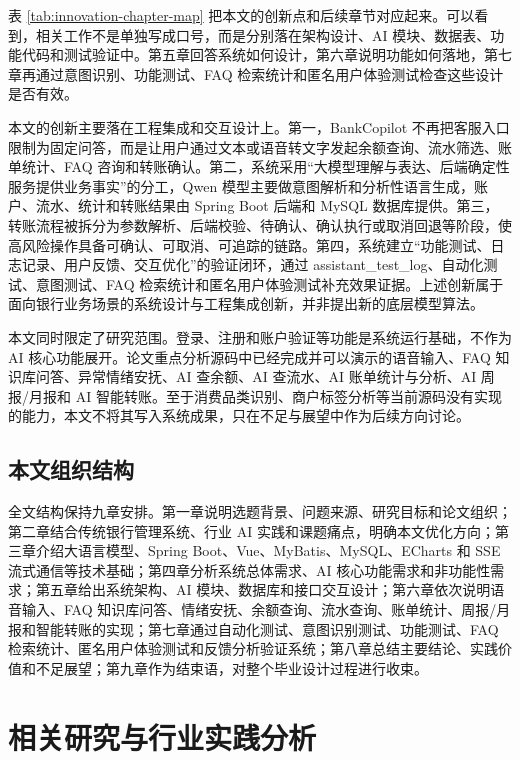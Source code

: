 \documentclass[bachelor, print]{xduthesis}
\begin{document}
表 \ref{tab:innovation-chapter-map} 把本文的创新点和后续章节对应起来。可以看到，相关工作不是单独写成口号，而是分别落在架构设计、AI 模块、数据表、功能代码和测试验证中。第五章回答系统如何设计，第六章说明功能如何落地，第七章再通过意图识别、功能测试、FAQ 检索统计和匿名用户体验测试检查这些设计是否有效。

本文的创新主要落在工程集成和交互设计上。第一，BankCopilot 不再把客服入口限制为固定问答，而是让用户通过文本或语音转文字发起余额查询、流水筛选、账单统计、FAQ 咨询和转账确认。第二，系统采用“大模型理解与表达、后端确定性服务提供业务事实”的分工，Qwen 模型主要做意图解析和分析性语言生成，账户、流水、统计和转账结果由 Spring Boot 后端和 MySQL 数据库提供。第三，转账流程被拆分为参数解析、后端校验、待确认、确认执行或取消回退等阶段，使高风险操作具备可确认、可取消、可追踪的链路。第四，系统建立“功能测试、日志记录、用户反馈、交互优化”的验证闭环，通过 assistant\_test\_log、自动化测试、意图测试、FAQ 检索统计和匿名用户体验测试补充效果证据。上述创新属于面向银行业务场景的系统设计与工程集成创新，并非提出新的底层模型算法。

本文同时限定了研究范围。登录、注册和账户验证等功能是系统运行基础，不作为 AI 核心功能展开。论文重点分析源码中已经完成并可以演示的语音输入、FAQ 知识库问答、异常情绪安抚、AI 查余额、AI 查流水、AI 账单统计与分析、AI 周报/月报和 AI 智能转账。至于消费品类识别、商户标签分析等当前源码没有实现的能力，本文不将其写入系统成果，只在不足与展望中作为后续方向讨论。

\section{本文组织结构}

全文结构保持九章安排。第一章说明选题背景、问题来源、研究目标和论文组织；第二章结合传统银行管理系统、行业 AI 实践和课题痛点，明确本文优化方向；第三章介绍大语言模型、Spring Boot、Vue、MyBatis、MySQL、ECharts 和 SSE 流式通信等技术基础；第四章分析系统总体需求、AI 核心功能需求和非功能性需求；第五章给出系统架构、AI 模块、数据库和接口交互设计；第六章依次说明语音输入、FAQ 知识库问答、情绪安抚、余额查询、流水查询、账单统计、周报/月报和智能转账的实现；第七章通过自动化测试、意图识别测试、功能测试、FAQ 检索统计、匿名用户体验测试和反馈分析验证系统；第八章总结主要结论、实践价值和不足展望；第九章作为结束语，对整个毕业设计过程进行收束。

\chapter{相关研究与行业实践分析}
\end{document}

